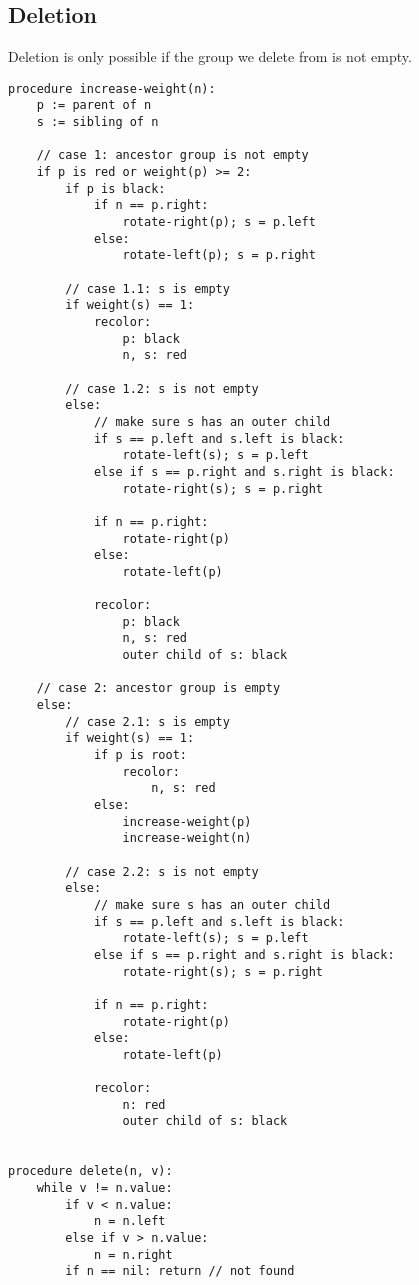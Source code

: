\documentclass{article}
\begin{document}
\subsection{Deletion}
Deletion is only possible if the group we delete from is not empty.

\begin{small}
\begin{verbatim}
procedure increase-weight(n):
    p := parent of n
    s := sibling of n

    // case 1: ancestor group is not empty
    if p is red or weight(p) >= 2:
        if p is black:
            if n == p.right:
                rotate-right(p); s = p.left
            else:
                rotate-left(p); s = p.right

        // case 1.1: s is empty
        if weight(s) == 1:
            recolor:
                p: black
                n, s: red

        // case 1.2: s is not empty
        else:
            // make sure s has an outer child
            if s == p.left and s.left is black:
                rotate-left(s); s = p.left
            else if s == p.right and s.right is black:
                rotate-right(s); s = p.right

            if n == p.right:
                rotate-right(p)
            else:
                rotate-left(p)

            recolor:
                p: black
                n, s: red
                outer child of s: black

    // case 2: ancestor group is empty
    else:
        // case 2.1: s is empty
        if weight(s) == 1:
            if p is root:
                recolor:
                    n, s: red
            else:
                increase-weight(p)
                increase-weight(n)

        // case 2.2: s is not empty
        else:
            // make sure s has an outer child
            if s == p.left and s.left is black:
                rotate-left(s); s = p.left
            else if s == p.right and s.right is black:
                rotate-right(s); s = p.right

            if n == p.right:
                rotate-right(p)
            else:
                rotate-left(p)

            recolor:
                n: red
                outer child of s: black


procedure delete(n, v):
    while v != n.value:
        if v < n.value:
            n = n.left
        else if v > n.value:
            n = n.right
        if n == nil: return // not found


\end{verbatim}
\end{small}
\end{document}
